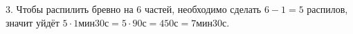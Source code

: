 3. Чтобы распилить бревно на 6 частей, необходимо сделать $6-1=5$ распилов, значит уйдёт $5\cdot1\text{мин}30\text{с}=5\cdot90\text{с}=450\text{с}=7\text{мин}30\text{с}.$\\
